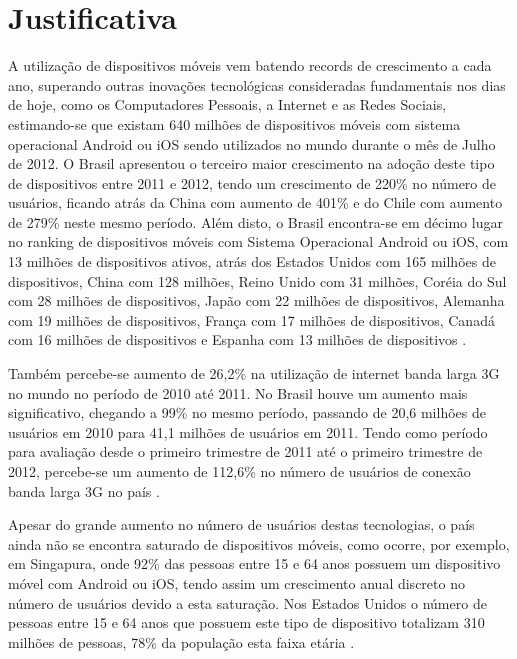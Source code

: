 \section{Justificativa}

A utilização de dispositivos móveis vem batendo records de crescimento a cada ano, superando outras inovações tecnológicas consideradas fundamentais nos dias de hoje, como os Computadores Pessoais, a Internet e as Redes Sociais, estimando-se que existam 640 milhões de dispositivos móveis com sistema operacional Android ou iOS sendo utilizados no mundo durante o mês de Julho de 2012. O Brasil apresentou o terceiro maior crescimento na adoção deste tipo de dispositivos entre 2011 e 2012, tendo um crescimento de 220\% no número de usuários, ficando atrás da China com aumento de 401\% e do Chile com aumento de 279\% neste mesmo período. Além disto, o Brasil encontra-se em décimo lugar no ranking de dispositivos móveis com Sistema Operacional Android ou iOS, com 13 milhões de dispositivos ativos, atrás dos Estados Unidos com 165 milhões de dispositivos, China com 128 milhões, Reino Unido com 31 milhões, Coréia do Sul com 28 milhões de dispositivos, Japão com 22 milhões de dispositivos, Alemanha com 19 milhões de dispositivos, França com 17 milhões de dispositivos, Canadá com 16 milhões de dispositivos e Espanha com 13 milhões de dispositivos
\cite{flurry2012}.

Também percebe-se aumento de 26,2\% na utilização de internet banda larga 3G no mundo no período de 2010 até 2011. No Brasil houve um aumento mais significativo, chegando a 99\% no mesmo período, passando de 20,6 milhões de usuários em 2010 para 41,1 milhões de usuários em 2011. Tendo como período para avaliação desde o primeiro trimestre de 2011 até o primeiro trimestre de 2012, percebe-se um aumento de 112,6\% no número de usuários de conexão banda larga 3G no país \cite{Huawei1T2012}.

Apesar do grande aumento no número de usuários destas tecnologias, o país ainda não se encontra saturado de dispositivos móveis, como ocorre, por exemplo, em Singapura, onde 92\% das pessoas entre 15 e 64 anos possuem um dispositivo móvel com Android ou iOS, tendo assim um crescimento anual discreto no número de usuários devido a esta saturação. Nos Estados Unidos o número de pessoas entre 15 e 64 anos que possuem este tipo de dispositivo totalizam 310 milhões de pessoas, 78\% da população esta faixa etária \cite{flurry2012}.

